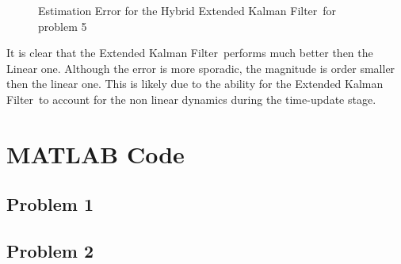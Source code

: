 \documentclass[]{article}
\newcommand{\KF}{Kalman Filter}
\begin{document}
		\begin{figure}[h]
			\centering
			\caption{Estimation Error for the Hybrid Extended \KF \ for problem 5}
			\label{fig:pblm5esterrorEKF}
		\end{figure}
		
		It is clear that the Extended \KF \ performs much better then the Linear one. Although the error is more sporadic, the magnitude is order smaller then the linear one. This is likely due to the ability for the Extended \KF \ to account for the non linear dynamics during the time-update stage.
		
\newpage
\appendix
\section{MATLAB Code} \label{apx:MATLAB_Code}
	
	
	
	\newpage
	\subsection{Problem 1}
	
	\newpage
	
	
	\newpage
	\subsection{Problem 2}
	
	\newpage
	
	\newpage
	
	
\end{document}
